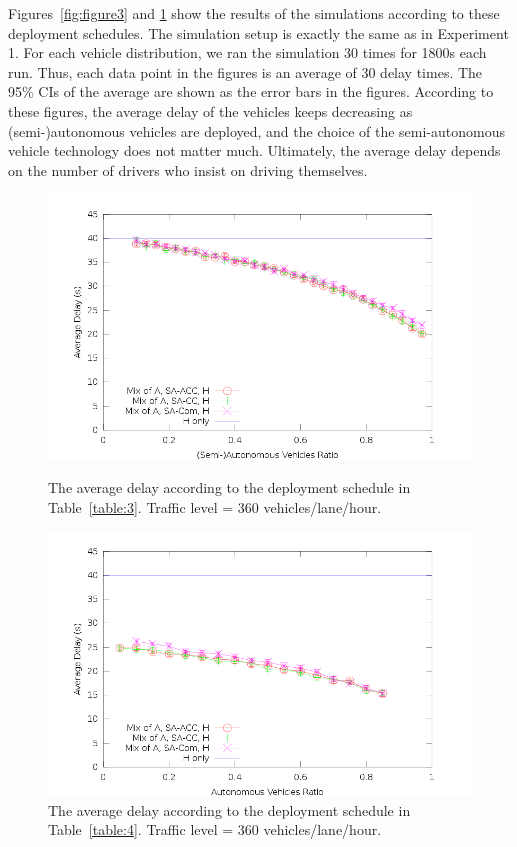 Figures~\ref{fig:figure3} and \ref{fig:figure4} show the results of
the simulations according to these deployment schedules.  The
simulation setup is exactly the same as in Experiment 1.
For each vehicle distribution, we ran the simulation 30 times for 1800s each run.  Thus, each data point in the figures is
an average of 30 delay times.  The 95\% CIs of the average are shown
as the error bars in the figures.  According to these figures, the
average delay of the vehicles keeps decreasing as
(semi-)autonomous vehicles are deployed, and the choice of the
semi-autonomous vehicle technology does not matter much.  Ultimately, the
average delay depends on the number of drivers who insist on driving
themselves.

\begin{figure}[hp]

\centering
\includegraphics[width=0.9\columnwidth]{figures/figure_3.png}
\caption{The average delay according to the 
deployment schedule in Table~\ref{table:3}.
Traffic level = 360 vehicles/lane/hour.}
\label{fig:figure3}

\mbox{}

\centering
\includegraphics[width=0.9\columnwidth]{figures/figure_4.png}
\caption{The average delay according to the 
deployment schedule in Table~\ref{table:4}.
Traffic level = 360 vehicles/lane/hour.}
\label{fig:figure4}
\end{figure}


